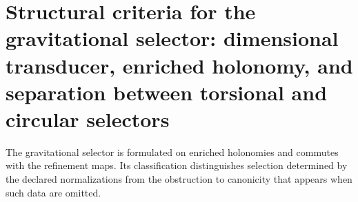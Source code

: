 \chapter{Structural criteria for the gravitational selector: dimensional transducer, enriched holonomy, and separation between torsional and circular selectors}
\label{chap:parte-iv-66}
The gravitational selector is formulated on enriched holonomies and commutes
with the refinement maps. Its classification distinguishes selection
determined by the declared normalizations from the obstruction to
canonicity that appears when such data are omitted.

\begingroup
\let\HMTOwnerSection\section
\let\HMTOwnerSubsection\subsection
\let\HMTOwnerSubsubsection\subsubsection
\let\HMTOwnerParagraph\paragraph
\let\chapter\HMTOwnerSection
\let\section\HMTOwnerSubsection
\let\subsection\HMTOwnerSubsubsection
\let\subsubsection\HMTOwnerParagraph

\endgroup
\begingroup
\let\HMTOwnerSection\section
\let\HMTOwnerSubsection\subsection

